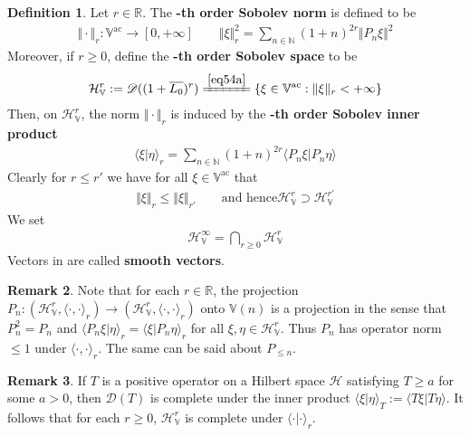 \documentclass[12pt,b5paper,notitlepage]{article}
\theoremstyle{definition}
\newtheorem{df}{Definition}[section]
\newtheorem{rem}[df]{Remark}
\theoremstyle{plain}
\newcommand{\mc}{\mathcal}
\newcommand{\ovl}{\overline}
\newcommand{\Dom}{\scr{D}}
\newcommand{\bk}[1]{\langle {#1}\rangle}
\newcommand{\scr}{\mathscr}
\newcommand{\Vbb}{\mathbb V}
\newcommand{\Nbb}{\mathbb N}
\newcommand{\Rbb}{\mathbb R}
\newcommand{\HV}{\mathcal H_{\mathbb V}}
\newcommand{\ac}{\mathrm{ac}}
\numberwithin{equation}{section}
\begin{document}
\begin{df}
Let $r\in\Rbb$. The \textbf{-th order Sobolev norm}  is defined to be
\begin{gather*}
\Vert\cdot\Vert_r:\Vbb^\ac\rightarrow[0,+\infty]\qquad \big\Vert\xi\big\Vert_r^2=\sum_{n\in\Nbb}(1+n)^{2r}\Vert P_n\xi\Vert^2
\end{gather*}
Moreover, if $r\geq0$, define the \textbf{-th order Sobolev space} to be \index{HV@$\mc H_\Vbb^r,\HV^\infty$} 
\begin{align*}
\mc H_\Vbb^r:=\Dom((1+\ovl {L_0})^r)\xlongequal{\eqref{eq54a}} \{\xi\in\Vbb^\ac:\Vert\xi\Vert_r<+\infty\}
\end{align*}
Then, on $\HV^r$, the norm $\Vert\cdot\Vert_r$ is induced by the \textbf{-th order Sobolev inner product} 
\begin{align*}
\bk{\xi|\eta}_r=\sum_{n\in\Nbb}(1+n)^{2r}\bk{P_n\xi|P_n\eta}
\end{align*}
Clearly for $r\leq r'$ we have for all $\xi\in\Vbb^\ac$ that
\begin{align*}
\Vert\xi\Vert_r\leq\Vert\xi\Vert_{r'} \qquad\text{and hence} \HV^r\supset\HV^{r'}
\end{align*}
We set
\begin{align*}
\HV^\infty=\bigcap_{r\geq0}\HV^r
\end{align*}
Vectors in \pmb{$\HV^\infty$} are called \textbf{smooth vectors}. 
\end{df}

\begin{rem}\label{lb37}
Note that for each $r\in\Rbb$, the projection $P_n:(\HV^r,\bk{\cdot,\cdot}_r)\rightarrow (\HV^r,\bk{\cdot,\cdot}_r)$ onto $\Vbb(n)$ is a projection in the sense that $P_n^2=P_n$ and $\bk{P_n\xi|\eta}_r=\bk{\xi|P_n\eta}_r$ for all $\xi,\eta\in\HV^r$. Thus $P_n$ has operator norm $\leq 1$ under $\bk{\cdot,\cdot}_r$. The same can be said about $P_{\leq n}$.
\end{rem}


\begin{rem}\label{lb51}
If $T$ is a positive operator on a Hilbert space $\mc H$ satisfying $T\geq a$ for some $a>0$, then $\Dom(T)$ is complete under the inner product $\bk{\xi|\eta}_T:=\bk{T\xi|T\eta}$. It follows that for each $r\geq0$, $\HV^r$ is complete under $\bk{\cdot|\cdot}_r$.
\end{rem}
\end{document}
